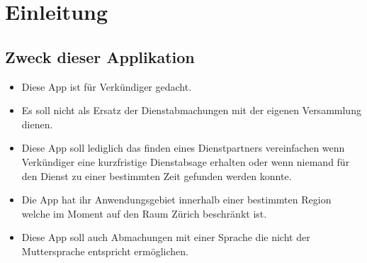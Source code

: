 \section{Einleitung}

\subsection{Zweck dieser Applikation}
\begin{itemize}
\item Diese App ist für Verkündiger gedacht.
\item Es soll nicht als Ersatz der Dienstabmachungen mit der eigenen Versammlung dienen.
\item Diese App soll lediglich das finden eines Dienstpartners vereinfachen wenn Verkündiger eine kurzfristige Dienstabsage erhalten oder wenn niemand für den Dienst zu einer bestimmten Zeit gefunden werden konnte.
\item Die App hat ihr Anwendungsgebiet innerhalb einer bestimmten Region welche im Moment auf den Raum Zürich beschränkt ist.
\item Diese App soll auch Abmachungen mit einer Sprache die nicht der Muttersprache entspricht ermöglichen.
\end{itemize}
